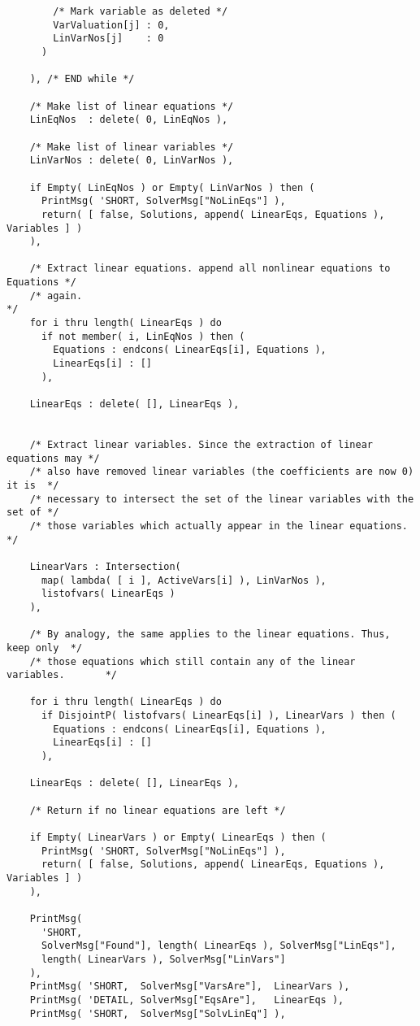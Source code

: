 \begin{verbatim}
        /* Mark variable as deleted */
        VarValuation[j] : 0,
        LinVarNos[j]    : 0
      )

    ), /* END while */

    /* Make list of linear equations */
    LinEqNos  : delete( 0, LinEqNos ),

    /* Make list of linear variables */
    LinVarNos : delete( 0, LinVarNos ),

    if Empty( LinEqNos ) or Empty( LinVarNos ) then (
      PrintMsg( 'SHORT, SolverMsg["NoLinEqs"] ),
      return( [ false, Solutions, append( LinearEqs, Equations ), Variables ] )
    ),

    /* Extract linear equations. append all nonlinear equations to Equations */
    /* again.                                                                */
    for i thru length( LinearEqs ) do
      if not member( i, LinEqNos ) then (
        Equations : endcons( LinearEqs[i], Equations ),
        LinearEqs[i] : []
      ),

    LinearEqs : delete( [], LinearEqs ),


    /* Extract linear variables. Since the extraction of linear equations may */
    /* also have removed linear variables (the coefficients are now 0) it is  */
    /* necessary to intersect the set of the linear variables with the set of */
    /* those variables which actually appear in the linear equations.         */
  
    LinearVars : Intersection(
      map( lambda( [ i ], ActiveVars[i] ), LinVarNos ),
      listofvars( LinearEqs )
    ),

    /* By analogy, the same applies to the linear equations. Thus, keep only  */
    /* those equations which still contain any of the linear variables.       */

    for i thru length( LinearEqs ) do
      if DisjointP( listofvars( LinearEqs[i] ), LinearVars ) then (
        Equations : endcons( LinearEqs[i], Equations ),
        LinearEqs[i] : []
      ),

    LinearEqs : delete( [], LinearEqs ),

    /* Return if no linear equations are left */

    if Empty( LinearVars ) or Empty( LinearEqs ) then (
      PrintMsg( 'SHORT, SolverMsg["NoLinEqs"] ),
      return( [ false, Solutions, append( LinearEqs, Equations ), Variables ] )
    ),

    PrintMsg(
      'SHORT,
      SolverMsg["Found"], length( LinearEqs ), SolverMsg["LinEqs"],
      length( LinearVars ), SolverMsg["LinVars"]
    ),
    PrintMsg( 'SHORT,  SolverMsg["VarsAre"],  LinearVars ),
    PrintMsg( 'DETAIL, SolverMsg["EqsAre"],   LinearEqs ),
    PrintMsg( 'SHORT,  SolverMsg["SolvLinEq"] ),


\end{verbatim}
